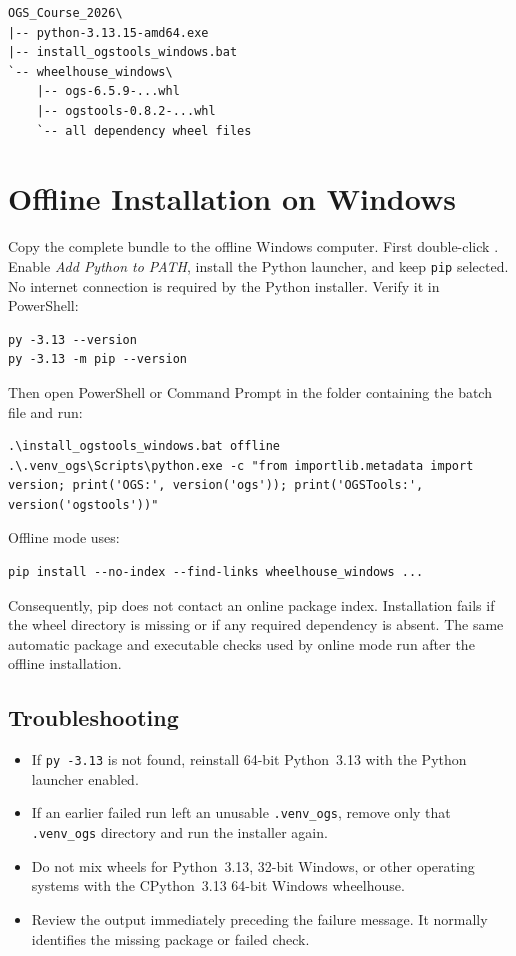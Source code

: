 \documentclass[11pt,a4paper]{tubaf-report}
\begin{document}
\begin{lstlisting}[style=terminal]
OGS_Course_2026\
|-- python-3.13.15-amd64.exe
|-- install_ogstools_windows.bat
`-- wheelhouse_windows\
    |-- ogs-6.5.9-...whl
    |-- ogstools-0.8.2-...whl
    `-- all dependency wheel files
\end{lstlisting}

\chapter{Offline Installation on Windows}

Copy the complete bundle to the offline Windows computer. First double-click
. Enable \emph{Add Python to PATH}, install the
Python launcher, and keep \texttt{pip} selected. No internet connection is
required by the Python installer. Verify it in PowerShell:

\begin{lstlisting}[style=terminal]
py -3.13 --version
py -3.13 -m pip --version
\end{lstlisting}

Then open PowerShell or Command Prompt in the folder containing the batch file
and run:

\begin{lstlisting}[style=terminal]
.\install_ogstools_windows.bat offline
.\.venv_ogs\Scripts\python.exe -c "from importlib.metadata import version; print('OGS:', version('ogs')); print('OGSTools:', version('ogstools'))"
\end{lstlisting}

Offline mode uses:

\begin{lstlisting}[style=terminal]
pip install --no-index --find-links wheelhouse_windows ...
\end{lstlisting}

Consequently, pip does not contact an online package index. Installation fails
if the wheel directory is missing or if any required dependency is absent. The
same automatic package and executable checks used by online mode run after the
offline installation.

\section{Troubleshooting}

\begin{itemize}
    \item If \texttt{py -3.13} is not found, reinstall 64-bit Python~3.13 with
          the Python launcher enabled.
    \item If an earlier failed run left an unusable \texttt{.venv\_ogs}, remove only
          that \texttt{.venv\_ogs} directory and run the installer again.
    \item Do not mix wheels for Python~3.13, 32-bit Windows, or other operating
          systems with the CPython~3.13 64-bit Windows wheelhouse.
    \item Review the output immediately preceding the failure message. It normally
          identifies the missing package or failed check.
\end{itemize}
\end{document}
